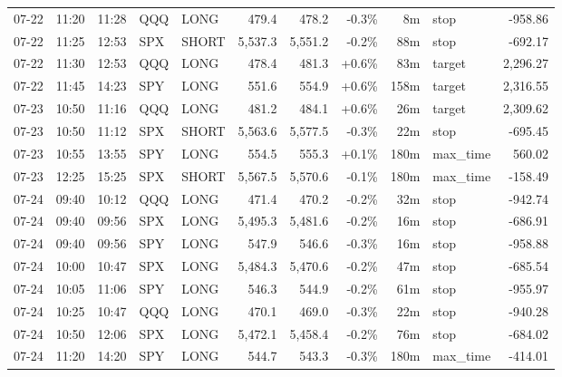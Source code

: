 \documentclass[11pt,a4paper,twoside]{article}
\begin{document}
\begin{center}
\begin{longtable}{>{\color{txtmain}}l l l l l r r r r >{\color{txtmain}}l r}
07-22 & 11:20 & 11:28 & QQQ & LONG & 479.4 & 478.2 & \textcolor{lossred}{-0.3\%} & 8m & stop & \textcolor{lossred}{-958.86} \\
07-22 & 11:25 & 12:53 & SPX & SHORT & 5,537.3 & 5,551.2 & \textcolor{lossred}{-0.2\%} & 88m & stop & \textcolor{lossred}{-692.17} \\
07-22 & 11:30 & 12:53 & QQQ & LONG & 478.4 & 481.3 & \textcolor{wingreen}{+0.6\%} & 83m & target & \textcolor{wingreen}{2,296.27} \\
07-22 & 11:45 & 14:23 & SPY & LONG & 551.6 & 554.9 & \textcolor{wingreen}{+0.6\%} & 158m & target & \textcolor{wingreen}{2,316.55} \\
07-23 & 10:50 & 11:16 & QQQ & LONG & 481.2 & 484.1 & \textcolor{wingreen}{+0.6\%} & 26m & target & \textcolor{wingreen}{2,309.62} \\
07-23 & 10:50 & 11:12 & SPX & SHORT & 5,563.6 & 5,577.5 & \textcolor{lossred}{-0.3\%} & 22m & stop & \textcolor{lossred}{-695.45} \\
07-23 & 10:55 & 13:55 & SPY & LONG & 554.5 & 555.3 & \textcolor{wingreen}{+0.1\%} & 180m & max\_time & \textcolor{wingreen}{560.02} \\
07-23 & 12:25 & 15:25 & SPX & SHORT & 5,567.5 & 5,570.6 & \textcolor{lossred}{-0.1\%} & 180m & max\_time & \textcolor{lossred}{-158.49} \\
07-24 & 09:40 & 10:12 & QQQ & LONG & 471.4 & 470.2 & \textcolor{lossred}{-0.2\%} & 32m & stop & \textcolor{lossred}{-942.74} \\
07-24 & 09:40 & 09:56 & SPX & LONG & 5,495.3 & 5,481.6 & \textcolor{lossred}{-0.2\%} & 16m & stop & \textcolor{lossred}{-686.91} \\
07-24 & 09:40 & 09:56 & SPY & LONG & 547.9 & 546.6 & \textcolor{lossred}{-0.3\%} & 16m & stop & \textcolor{lossred}{-958.88} \\
07-24 & 10:00 & 10:47 & SPX & LONG & 5,484.3 & 5,470.6 & \textcolor{lossred}{-0.2\%} & 47m & stop & \textcolor{lossred}{-685.54} \\
07-24 & 10:05 & 11:06 & SPY & LONG & 546.3 & 544.9 & \textcolor{lossred}{-0.2\%} & 61m & stop & \textcolor{lossred}{-955.97} \\
07-24 & 10:25 & 10:47 & QQQ & LONG & 470.1 & 469.0 & \textcolor{lossred}{-0.3\%} & 22m & stop & \textcolor{lossred}{-940.28} \\
07-24 & 10:50 & 12:06 & SPX & LONG & 5,472.1 & 5,458.4 & \textcolor{lossred}{-0.2\%} & 76m & stop & \textcolor{lossred}{-684.02} \\
07-24 & 11:20 & 14:20 & SPY & LONG & 544.7 & 543.3 & \textcolor{lossred}{-0.3\%} & 180m & max\_time & \textcolor{lossred}{-414.01} \\

\end{longtable}
\end{center}
\end{document}
